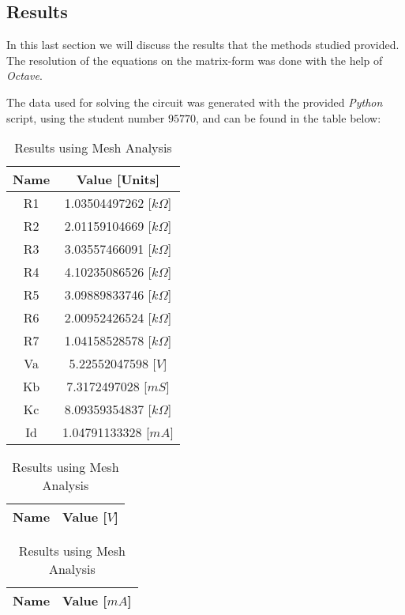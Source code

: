 \pagebreak
\subsection{Results}
\label{subsec:results}

In this last section we will discuss the results that the methods studied provided. The resolution of the equations on the matrix-form was done with the help of \textit{Octave}. 


The data used for solving the circuit was generated with the provided \textit{Python} script, using the student number $95770$, and can be found in the table below:
\begin{table}[h]
\parbox{.36\linewidth}{
  \centering
  \begin{tabular}{|c|c|}
    \hline

    {\bf Name} & {\bf Value [Units]} \\ \hline
    R1 & 1.03504497262 [$k\Omega$]\\ \hline
    R2 & 2.01159104669 [$k\Omega$]\\ \hline
    R3 & 3.03557466091 [$k\Omega$]\\ \hline
    R4 & 4.10235086526 [$k\Omega$]\\ \hline
    R5 & 3.09889833746 [$k\Omega$]\\ \hline
    R6 & 2.00952426524 [$k\Omega$]\\ \hline
    R7 & 1.04158528578 [$k\Omega$]\\ \hline
    Va & 5.22552047598 [$V$]\\ \hline
    Kb & 7.3172497028 [$mS$]\\ \hline
    Kc & 8.09359354837 [$k\Omega$]\\ \hline
    Id & 1.04791133328 [$mA$]\\ \hline
    
  \end{tabular}
  \caption[Data used]{Data used}
  \label{tab:data}
  }
  \hfill
  \parbox{.25\textwidth}{
  \centering  
  \begin{tabular}{|c|c|}
    \hline    
    {\bf Name} & {\bf Value [$V$]} \\ \hline
    
  \end{tabular}
  \caption[Results using Nodal Analysis]{Results using Nodal Analysis}
  \label{tab:nodal}
  }
  \hfill
  \parbox{0.25\textwidth}{
  \centering
  \begin{tabular}{|c|c|}
    \hline    
    {\bf Name} & {\bf Value [$mA$]} \\ \hline
    
  \end{tabular}
  \caption[Results using Mesh Analysis]{Results using Mesh Analysis}
  \label{tab:mesh}
  }
\end{table}

